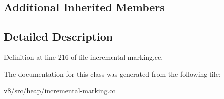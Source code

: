 \subsection*{Additional Inherited Members}


\subsection{Detailed Description}


Definition at line 216 of file incremental-\/marking.\+cc.



The documentation for this class was generated from the following file\+:\begin{DoxyCompactItemize}
\item 
v8/src/heap/incremental-\/marking.\+cc\end{DoxyCompactItemize}
